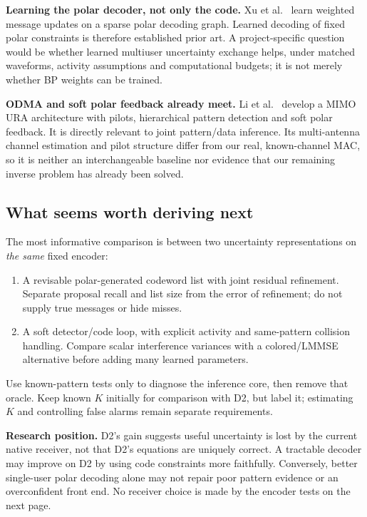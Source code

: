 \documentclass[10pt,a4paper]{article}
\begin{document}
\textbf{Learning the polar decoder, not only the code.} Xu et al.~\cite{learnedpolar} learn weighted message updates
on a sparse polar decoding graph. Learned decoding of fixed polar constraints is therefore established prior art.
A project-specific question would be whether learned multiuser uncertainty exchange helps, under matched waveforms,
activity assumptions and computational budgets; it is not merely whether BP weights can be trained.

\textbf{ODMA and soft polar feedback already meet.} Li et al.~\cite{mimoodma} develop a MIMO URA architecture with
pilots, hierarchical pattern detection and soft polar feedback. It is directly relevant to joint pattern/data
inference. Its multi-antenna channel estimation and pilot structure differ from our real, known-channel MAC, so it
is neither an interchangeable baseline nor evidence that our remaining inverse problem has already been solved.

\subsection{What seems worth deriving next}
The most informative comparison is between two uncertainty representations on \emph{the same} fixed encoder:
\begin{enumerate}
\item A revisable polar-generated codeword list with joint residual refinement. Separate proposal recall and
      list size from the error of refinement; do not supply true messages or hide misses.
\item A soft detector/code loop, with explicit activity and same-pattern collision handling. Compare scalar
      interference variances with a colored/LMMSE alternative before adding many learned parameters.
\end{enumerate}
Use known-pattern tests only to diagnose the inference core, then remove that oracle. Keep known $K$ initially for
comparison with D2, but label it; estimating $K$ and controlling false alarms remain separate requirements.

\textbf{Research position.} D2's gain suggests useful uncertainty is lost by the current native receiver, not that
D2's equations are uniquely correct. A tractable decoder may improve on D2 by using code constraints more faithfully.
Conversely, better single-user polar decoding alone may not repair poor pattern evidence or an overconfident front end.
No receiver choice is made by the encoder tests on the next page.
\end{document}
